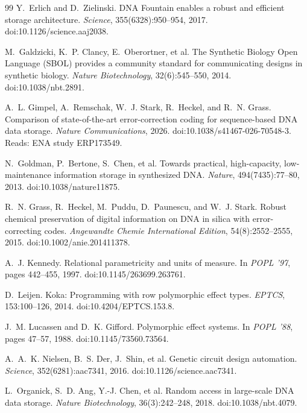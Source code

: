 \documentclass[11pt,a4paper]{article}
\begin{document}
\begin{thebibliography}{99}
Y.~Erlich and D.~Zielinski.
\newblock DNA Fountain enables a robust and efficient storage architecture.
\newblock \emph{Science}, 355(6328):950--954, 2017.
\newblock doi:10.1126/science.aaj2038.

M.~Galdzicki, K.~P. Clancy, E.~Oberortner, et al.
\newblock The Synthetic Biology Open Language (SBOL) provides a community standard for communicating designs in synthetic biology.
\newblock \emph{Nature Biotechnology}, 32(6):545--550, 2014.
\newblock doi:10.1038/nbt.2891.

A.~L. Gimpel, A.~Remschak, W.~J. Stark, R.~Heckel, and R.~N. Grass.
\newblock Comparison of state-of-the-art error-correction coding for sequence-based DNA data storage.
\newblock \emph{Nature Communications}, 2026.
\newblock doi:10.1038/s41467-026-70548-3. Reads: ENA study ERP173549.

N.~Goldman, P.~Bertone, S.~Chen, et al.
\newblock Towards practical, high-capacity, low-maintenance information storage in synthesized DNA.
\newblock \emph{Nature}, 494(7435):77--80, 2013.
\newblock doi:10.1038/nature11875.

R.~N. Grass, R.~Heckel, M.~Puddu, D.~Paunescu, and W.~J. Stark.
\newblock Robust chemical preservation of digital information on DNA in silica with error-correcting codes.
\newblock \emph{Angewandte Chemie International Edition}, 54(8):2552--2555, 2015.
\newblock doi:10.1002/anie.201411378.

A.~J. Kennedy.
\newblock Relational parametricity and units of measure.
\newblock In \emph{POPL '97}, pages 442--455, 1997.
\newblock doi:10.1145/263699.263761.

D.~Leijen.
\newblock Koka: Programming with row polymorphic effect types.
\newblock \emph{EPTCS}, 153:100--126, 2014.
\newblock doi:10.4204/EPTCS.153.8.

J.~M. Lucassen and D.~K. Gifford.
\newblock Polymorphic effect systems.
\newblock In \emph{POPL '88}, pages 47--57, 1988.
\newblock doi:10.1145/73560.73564.

A.~A.~K. Nielsen, B.~S. Der, J.~Shin, et al.
\newblock Genetic circuit design automation.
\newblock \emph{Science}, 352(6281):aac7341, 2016.
\newblock doi:10.1126/science.aac7341.

L.~Organick, S.~D. Ang, Y.-J. Chen, et al.
\newblock Random access in large-scale DNA data storage.
\newblock \emph{Nature Biotechnology}, 36(3):242--248, 2018.
\newblock doi:10.1038/nbt.4079.


\end{thebibliography}
\end{document}
